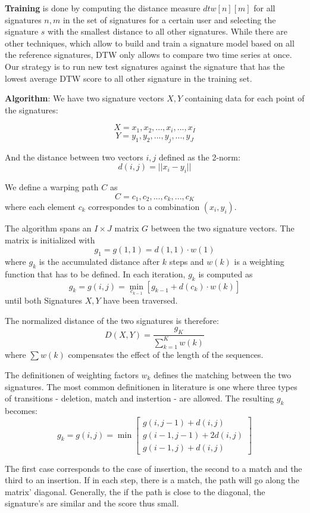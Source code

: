 \documentclass[a4paper, oneside]{csthesis}
\begin{document}
\textbf{Training} is done by computing the distance measure $dtw[n][m]$ for all signatures $n, m$ in the set of signatures for a certain user and selecting the signature $s$ with the smallest distance to all other signatures. While there are other techniques, which allow to build and train a signature model based on all the reference signatures, DTW only allows to compare two time series at once. Our strategy is to run new test signatures against the signature that has the lowest average DTW score to all other signature in the training set.


\textbf{Algorithm}: We have two signature vectors $X,Y$ containing data for each point of the signatures:

$$X = x_1, x_2, ... , x_i, ... , x_I$$ $$Y = y_1, y_2, ..., y_j, ..., y_J$$

And the distance between two vectors $i,j$ defined as the 2-norm: $$d(i,j) = ||x_i - y_i||$$

We define a warping path $C$ as $$ C = c_1, c_2, ..., c_k, ..., c_K $$ where each element $c_k$ correspondes to a combination $(x_i, y_i)$.

The algorithm spans an $I \times J$ matrix $G$ between the two signature vectors. The matrix is initialized with $$g_1 = g(1,1) = d(1,1) \cdot w(1)$$ where $g_k$ is the accumulated distance after $k$ steps and $w(k)$ is a weighting function that has to be defined.
In each iteration, $g_k$ is computed as $$g_k = g(i,j) = \min\limits_{c_{k-1}} [g_{k-1}+d(c_k) \cdot w(k)]$$ until both Signatures $X,Y$ have been traversed.

The normalized distance of the two signatures is therefore: $$D(X,Y) = \frac{g_K}{\sum_{k=1}^K w(k)}$$ where $\sum w(k)$ compensates the effect of the length of the sequences.

The definitionen of weighting factors $w_k$ defines the matching between the two signatures. The most common definitionen in literature is one where three types of transitions - deletion, match and instertion - are allowed. The resulting $g_k$ becomes:
$$g_k = g(i,j) = \min \left[\begin{array}{c}g(i,j-1) + d(i,j) \\g(i-1,j-1)+ 2 d(i,j) \\g(i-1,j) + d(i,j)\end{array}\right]$$

The first case corresponds to the case of insertion, the second to a match and the third to an insertion. If in each step, there is a match, the path will go along the matrix' diagonal. Generally, the if the path is close to the diagonal, the signature's are similar and the score thus small.
\end{document}

